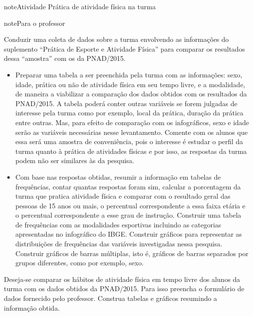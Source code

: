 \practice{ }
\label{\detokenize{PE103-2::doc}}\label{\detokenize{PE103-2:praticando}}\label{\detokenize{PE103-2:ativ-1-pratica-atividade-fisica-na-turma}}
\begin{sphinxadmonition}{note}{Atividade}{ Prática de atividade física na turma}

\begin{sphinxadmonition}{note}{Para o professor}

 Conduzir uma coleta de dados sobre a turma envolvendo as informações do suplemento ``Prática de Esporte e Atividade Física'' para comparar os resultados dessa ``amostra'' com os da PNAD/2015.

\begin{itemize}
\item {} 
Preparar uma tabela a ser preenchida pela turma com as informações: sexo, idade, prática ou não de atividade física em seu tempo livre, e a modalidade, de maneira a viabilizar a comparação dos dados obtidos com os resultados da PNAD/2015. A tabela poderá conter outras variáveis se forem julgadas de interesse pela turma como por exemplo, local da prática, duração da prática entre outras. Mas, para efeito de comparação com os infográficos, sexo e idade serão as variáveis necessárias nesse levantamento. Comente com os alunos que essa será uma amostra de conveniência, pois o interesse é estudar o perfil da turma quanto à prática de atividades físicas e por isso, as respostas da turma podem não ser similares às da pesquisa.

\item {} 
Com base nas respostas obtidas, resumir a informação em tabelas de frequências, contar quantas respostas foram sim, calcular a porcentagem da turma que pratica atividade física e comparar com o resultado geral das pessoas de 15 anos ou mais, o percentual correspondente a essa faixa etária e o percentual correspondente a esse grau de instrução. Construir uma tabela de frequências com as modalidades esportivas incluindo as categorias apresentadas no infográfico do IBGE. Construir gráficos para representar as distribuições de frequências das variáveis investigadas nessa pesquisa. Construir gráficos de barras múltiplas, isto é, gráficos de barras separados por grupos diferentes, como por exemplo, sexo.

\end{itemize}
\end{sphinxadmonition}

Deseja-se comparar os hábitos de atividade física em tempo livre dos alunos da turma com os dados obtidos da PNAD/2015. Para isso preencha o formulário de dados fornecido pelo professor. Construa tabelas e gráficos resumindo a informação obtida.
\end{sphinxadmonition}
